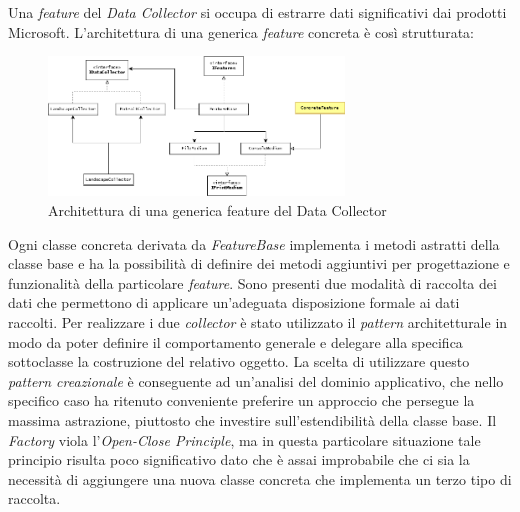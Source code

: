 Una \emph{feature} del \emph{Data Collector} si occupa di estrarre dati significativi dai prodotti Microsoft.
L’architettura di una generica \emph{feature} concreta è così strutturata:

\begin{figure}[H]
    \centering
    \captionsetup{justification=centering,margin=2cm}
        \includegraphics[width=0.7\textwidth ]{figures/analisi3.png}
        \caption [Architettura di una feature del Data Collector]{Architettura di una generica feature del Data Collector \label{fig:architetturadatacollector}}
\end{figure}

Ogni classe concreta derivata da \emph{FeatureBase} implementa i metodi astratti della classe base e ha la possibilità di definire dei metodi aggiuntivi per progettazione e funzionalità della particolare \emph{feature}. Sono presenti due modalità di raccolta dei dati che permettono di applicare un’adeguata disposizione formale ai dati raccolti. Per realizzare i due \emph{collector} è stato utilizzato il \emph{pattern} architetturale  in modo da poter definire il comportamento generale e delegare alla specifica sottoclasse la costruzione del relativo oggetto. La scelta di utilizzare questo \emph{pattern creazionale} è conseguente ad un’analisi del dominio applicativo, che nello specifico caso ha ritenuto conveniente preferire un approccio che persegue la massima astrazione, piuttosto che investire sull’estendibilità della classe base.
Il \emph{Factory} viola l’\emph{Open-Close Principle}, ma in questa particolare situazione tale principio risulta poco significativo dato che è assai improbabile che ci sia la necessità di aggiungere una nuova classe concreta che implementa un terzo tipo di raccolta. \cite{pattern}
